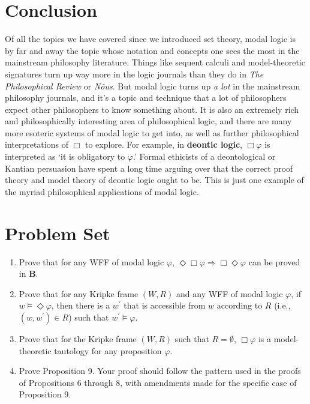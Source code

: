 \documentclass[11pt]{article}
\theoremstyle{definition}
\theoremstyle{remark}
\begin{document}
\section{Conclusion}
Of all the topics we have covered since we introduced set theory, modal logic is by far and away the topic whose notation and concepts one sees the most in the mainstream philosophy literature. Things like sequent calculi and model-theoretic signatures turn up way more in the logic journals than they do in \textit{The Philosophical Review} or \textit{N\^ous}. But modal logic turns up \textit{a lot} in the mainstream philosophy journals, and it's a topic and technique that a lot of philosophers expect other philosophers to know something about. It is also an extremely rich and philosophically interesting area of philosophical logic, and there are many more esoteric systems of modal logic to get into, as well as further philosophical interpretations of $\Box$ to explore. For example, in \textbf{deontic logic}, $\Box\varphi$ is interpreted as `it is obligatory to $\varphi$.' Formal ethicists of a deontological or Kantian persuasion have spent a long time arguing over that the correct proof theory and model theory of deontic logic ought to be. This is just one example of the myriad philosophical applications of modal logic.\par

\section*{Problem Set}
\begin{enumerate}
    \item Prove that for any WFF of modal logic $\varphi$, $\Diamond\Box\varphi\Rightarrow\Box\Diamond\varphi$ can be proved in \textbf{B}. 

    \item Prove that for any Kripke frame $(W,R)$ and any WFF of modal logic $\varphi$, if $w\vDash\Diamond \varphi$, then there is a $w^{\prime}$ that is accessible from $w$ according to $R$ (i.e., $(w,w^{\prime})\in R$) such that $w^{\prime}\vDash \varphi$. 

    \item Prove that for the Kripke frame $(W,R)$ such that $R=\emptyset$, $\Box \varphi$ is a model-theoretic tautology for any proposition $\varphi$. 

    \item Prove Proposition 9. Your proof should follow the pattern used in the proofs of Propositions 6 through 8, with amendments made for the specific case of Proposition 9.
\end{enumerate}
\end{document}
